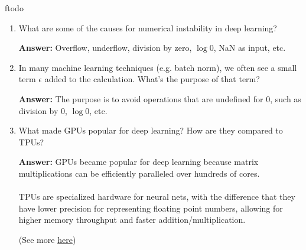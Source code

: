 ƒtodo\documentclass{article}
\newenvironment{QandA}{\begin{enumerate}[label=\arabic*.]}{\end{enumerate}}
\newenvironment{InnerQandA}{\begin{enumerate}[label=\roman*.]}{\end{enumerate}}
\newenvironment{answer}{\par\normalfont \textbf{Answer:}}{}
\begin{document}
\begin{QandA}
\begin{InnerQandA}
\begin{answer}
            However, this algorithm has exponential runtime complexity making it as inefficient as the naive approach of trying all permutations. The reason is that the algorithm does a lot of redundant work. For example, above we made a recursive call to find the best cost for computing both ABC and AB. But finding the best cost for computing ABC also requires finding the best cost for AB. As the recursion grows deeper, more and more of this type of unnecessary repetition occurs.
            
            One simple solution is called memoization: each time we compute the minimum cost needed to multiply out a specific subsequence, we save it. 
            
            (Source: \href{https://en.wikipedia.org/wiki/Matrix\_chain\_multiplication}{Wikipedia})
        \end{answer}
    \end{InnerQandA}
    
    \item What are some of the causes for numerical instability in deep learning?
    \begin{answer}
        Overflow, underflow, division by zero, $\log 0$, NaN as input, etc.
    \end{answer}

    \item In many machine learning techniques (e.g. batch norm), we often see a small term $\epsilon$ added to the calculation. What’s the purpose of that term?
    \begin{answer}
        The purpose is to avoid operations that are undefined for 0, such as division by 0, $\log 0$, etc.
    \end{answer}

    \item What made GPUs popular for deep learning? How are they compared to TPUs?
    \begin{answer}
        GPUs became popular for deep learning because matrix multiplications can be efficiently paralleled over hundreds of cores. \\\\
        TPUs are specialized hardware for neural nets, with the difference that they have lower precision for representing floating point numbers, allowing for higher memory throughput and faster addition/multiplication.

        (See more \href{https://www.quora.com/Why-do-Googles-tensor-processing-units-TPUs-use-less-precision-than-a-standard-GPU}{here})
    \end{answer}


\end{QandA}
\end{document}
